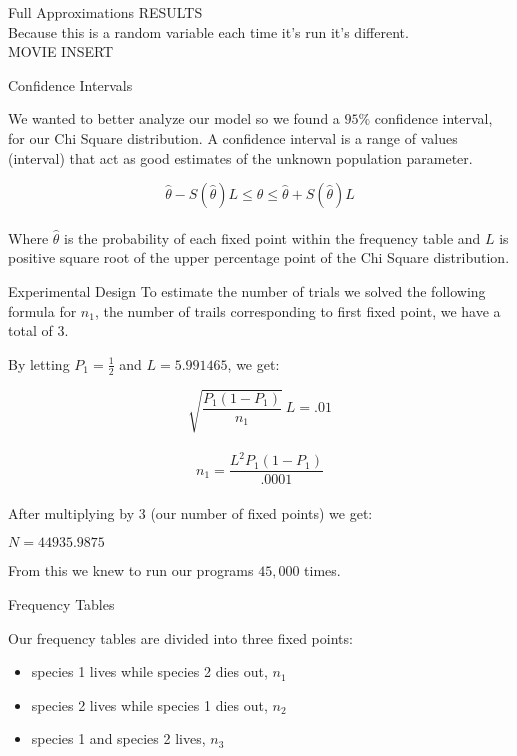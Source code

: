 \begin{frame}{Full Approximations}
RESULTS \\
Because this is a random variable each time it's run it's different. \\
MOVIE INSERT 
\end{frame}

\begin{frame}{Confidence Intervals}
	
	\vfill
	
We wanted to better analyze our model so we found a $95\%$ confidence interval, for our Chi Square distribution. A confidence interval is a range of values (interval) that act as good estimates of the unknown population parameter. 
  
  $$\hat{\theta} - S(\hat{\theta}) L \leq \theta \leq \hat{\theta} + S(\hat{\theta}) L$$ \\
		Where $\hat{\theta}$ is the probability of each fixed point within the frequency table and
		$L$ is positive square root of the upper percentage point of the Chi Square distribution.
		
	\vfill
		
\end{frame}

\begin{frame}{Experimental Design}
To estimate the number of trials we solved the following formula for $n_1$, the number of trails corresponding to first fixed point, we have a total of $3$. \\
	
	\vfill

By letting $P_1 = \frac{1}{2}$ and $L = 5.991465$, we get:

  $$\sqrt{\frac{P_1 (1-P_1)}{n_1}} \ L = .01$$ \\
  $$n_1 = \frac{L^2 P_1 (1-P_1)}{.0001}$$ \\
  After multiplying by $3$ (our number of fixed points) we get: \\
  \begin{center} $N = 44935.9875$ \end{center} 

  From this we knew to run our programs $45,000$ times. 
	
\vfill

\end{frame}

\begin{frame}{Frequency Tables}

		Our frequency tables are divided into three fixed points:
\begin{itemize}
	\item species 1 lives while species 2 dies out, $n_1$
	\item species 2 lives while species 1 dies out, $n_2$
	\item species 1 and species 2 lives, $n_3$
\end{itemize}
\end{frame}


